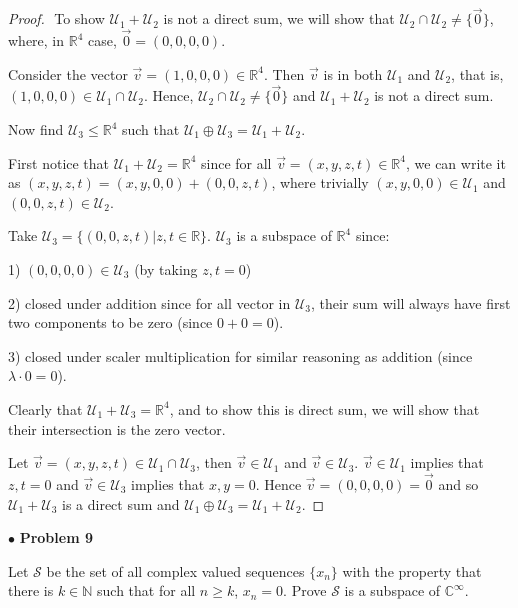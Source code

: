\documentclass{article}
\begin{document}
\begin{proof}
$ $ \newline
To show $\mathcal{U}_1 + \mathcal{U}_2$ is not a direct sum, we will show that $\mathcal{U}_2 \cap \mathcal{U}_2 \ne \{ \vec{0} \} $, where, in $\mathbb{R}^4$ case, $\vec{0} = (0,0,0,0)$.

Consider the vector $\vec{v} = (1,0,0,0) \in \mathbb{R}^4$. Then $\vec{v}$ is in both $\mathcal{U}_1$ and $\mathcal{U}_{2}$, that is, $(1,0,0,0) \in \mathcal{U}_1 \cap \mathcal{U}_2$. Hence, $\mathcal{U}_2 \cap \mathcal{U}_2 \ne \{ \vec{0} \} $ and $\mathcal{U}_1 + \mathcal{U}_2$ is not a direct sum.

\medskip
Now find $\mathcal{U}_{3} \le \mathbb{R}^4$ such that $\mathcal{U}_{1} \oplus \mathcal{U}_{3} = \mathcal{U}_{1} + \mathcal{U}_{2}$. 

First notice that $\mathcal{U}_1 + \mathcal{U}_2 = \mathbb{R}^4$ since for all $\vec{v} = (x, y, z, t) \in \mathbb{R}^4$, we can write it as $(x, y, z,t) = (x, y, 0, 0) + (0, 0, z, t)$, where trivially $(x, y, 0, 0) \in \mathcal{U}_1$ and $(0, 0, z, t) \in \mathcal{U}_2$.

Take $\mathcal{U}_3 = \{ (0,0,z,t) | z, t \in \mathbb{R} \}$. $\mathcal{U}_3$ is a subspace of $\mathbb{R}^4$ since:

1) $(0,0,0,0) \in \mathcal{U}_3$ (by taking $z, t =0$)

2) closed under addition since for all vector in $\mathcal{U}_3$, their sum will always have first two components to be zero (since $0+0 =0 $).

3) closed under scaler multiplication for similar reasoning as addition (since $\lambda \cdot 0 = 0$).

Clearly that $\mathcal{U}_1 + \mathcal{U}_3 = \mathbb{R}^4$, and to show this is direct sum, we will show that their intersection is the zero vector.

Let $\vec{v} = (x, y, z,t) \in \mathcal{U}_1 \cap \mathcal{U}_3$, then $\vec{v} \in \mathcal{U}_1$ and $\vec{v} \in \mathcal{U}_3$. $\vec{v} \in \mathcal{U}_1$ implies that $z, t = 0$ and $\vec{v} \in \mathcal{U}_3$ implies that $x, y = 0$. Hence $\vec{v} = (0,0,0,0) = \vec{0} $ and so $\mathcal{U}_1 + \mathcal{U}_3$ is a direct sum and $\mathcal{U}_1 \oplus \mathcal{U}_3 = \mathcal{U}_1 + \mathcal{U}_2$.

\end{proof}


\newpage
$\bullet$ \textbf{Problem 9}
\medskip

\begin{itshape}
Let $\mathcal{S}$ be the set of all complex valued sequences $\{ x_{n} \}$ with the property that there is $k \in \mathbb{N}$ such that for all $n \ge k$, $x_{n} = 0$. Prove $\mathcal{S}$ is a subspace of $\mathbb{C}^\infty$.
\end{itshape}
\medskip
\end{document}

